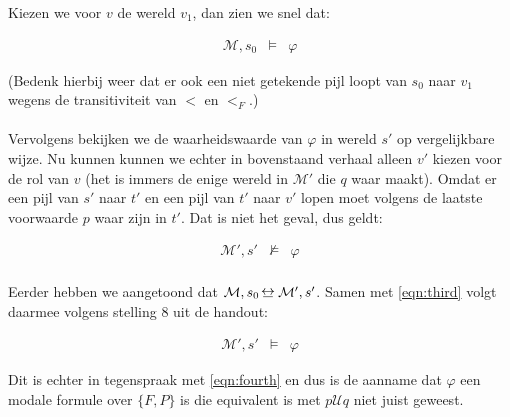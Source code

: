 \documentclass[a4paper,11pt]{article}
\newcommand{\bis}[1]{ \;%
  \raisebox{.3ex}{$\underline{\makebox[.7em]{$\leftrightarrow$}}$}
                  \,_{#1}\,}
\begin{document}
\begin{description}
Kiezen we voor $v$ de wereld $v_{1}$, dan zien we snel dat:

\begin{eqnarray}\label{eqn:third}
\mathcal{M},s_{0} & \models & \varphi
\end{eqnarray}

(Bedenk hierbij weer dat er ook een niet getekende pijl loopt van $s_{0}$ naar
$v_{1}$ wegens de transitiviteit van $<$ en $<_{F}$.)

\paragraph{}

Vervolgens bekijken we de waarheidswaarde van $\varphi$ in wereld
$s'$ op vergelijkbare wijze. Nu kunnen kunnen we echter in bovenstaand verhaal
alleen $v'$ kiezen voor de rol van $v$ (het is immers de enige wereld in
$\mathcal{M'}$ die $q$ waar maakt). Omdat er een pijl van $s'$ naar $t'$ en
een pijl van $t'$ naar $v'$ lopen moet volgens de laatste voorwaarde $p$ waar
zijn in $t'$. Dat is niet het geval, dus geldt:

\begin{eqnarray}\label{eqn:fourth}
\mathcal{M'},s' & \not\models & \varphi
\end{eqnarray}

\paragraph{}

Eerder hebben we aangetoond dat $\mathcal{M},s_{0} \bis{}
\mathcal{M'},s'$. Samen met \ref{eqn:third} volgt daarmee volgens stelling 8
uit de handout:

\begin{eqnarray*}
\mathcal{M'},s' & \models & \varphi
\end{eqnarray*}

Dit is echter in tegenspraak met \ref{eqn:fourth} en dus is de aanname dat
$\varphi$ een modale formule over $\{F,P\}$ is die equivalent is met $p
\mathcal{U} q$ niet juist geweest.

\end{description}
\end{document}
